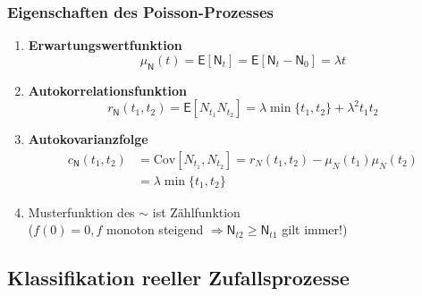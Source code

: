 \documentclass[a4paper,twocolumn,10pt]{article}
\newenvironment{abc}{\begin{enumerate}[label={\alph*)}]}{\end{enumerate}}
\newcommand{\erw}{\mathsf{E}}
\begin{document}
\subsubsection{Eigenschaften des Poisson-Prozesses}
\begin{abc}
\item \textbf{Erwartungswertfunktion}
\[ \mu_{\mathsf{N}}(t) = \erw[\mathsf{N}_{t}] = \erw[\mathsf{N}_{t} - \mathsf{N}_{0}] = \lambda t\]
\item \textbf{Autokorrelationsfunktion}
\[ r_{\mathsf{N}}(t_1,t_2)=\erw[N_{t_1}N_{t_2}] = \lambda \operatorname{min}\{t_1,t_2\} + \lambda^{2} t_1t_2\]
\item \textbf{Autokovarianzfolge}
\begin{equation*}
\begin{split}
c_{\mathsf{N}}(t_1,t_2) &= \text{Cov}[N_{t_1},N_{t_2}]=r_N(t_1,t_2)-\mu_N(t_1)\mu_N(t_2)\\
&= \lambda \operatorname{min}\{t_1,t_2\}
\end{split}
\end{equation*}
\item Musterfunktion des $\sim$ ist Zählfunktion\\
($f(0) = 0, f$ monoton steigend $\Rightarrow \mathsf{N}_{t2} \geq \mathsf{N}_{t1}$ gilt immer!)
\end{abc}

\subsection{Klassifikation reeller Zufallsprozesse}
\end{document}
